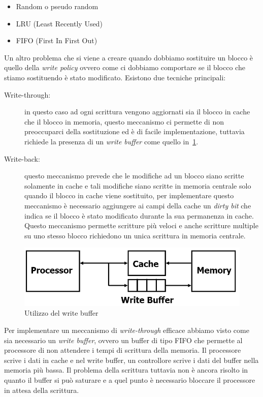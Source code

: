 \begin{itemize}
\item Random o pseudo random
\item LRU (Least Recently Used)
\item FIFO (First In First Out)
\end{itemize}
Un altro problema che si viene a creare quando dobbiamo sostituire un blocco è quello della \emph{write policy} ovvero come ci dobbiamo comportare se il blocco che stiamo sostituendo è stato modificato. Esistono due tecniche principali:
\begin{description}
\item[Write-through:] in questo caso ad ogni scrittura vengono aggiornati sia il blocco in cache che il blocco in memoria, questo meccanismo ci permette di non preoccuparci della sostituzione ed è di facile implementazione, tuttavia richiede la presenza di un \emph{write buffer} come quello in \figurename\,\ref{fig:writebuffer}. 
\item[Write-back:] questo meccanismo prevede che le modifiche ad un blocco siano scritte solamente in cache e tali modifiche siano scritte in memoria centrale solo quando il blocco in cache viene sostituito, per implementare questo meccanismo è necessario aggiungere ai campi della cache un \emph{dirty bit} che indica se il blocco è stato modificato durante la sua permanenza in cache.
Questo meccanismo permette scritture più veloci e anche scritture multiple su uno stesso blocco richiedono un unica scrittura in memoria centrale.
\end{description}
\begin{figure}[htb]
\centering
\includegraphics[scale=0.5]{img/writebuffer.png}
\caption{Utilizzo del write buffer}\label{fig:writebuffer}
\end{figure}
Per implementare un meccanismo di \emph{write-through} efficace abbiamo visto come sia necessario un \emph{write buffer}, ovvero un buffer di tipo FIFO che permette al processore di non attendere i tempi di scrittura della memoria. Il processore scrive i dati in cache e nel write buffer, un controllore scrive i dati del buffer nella memoria più bassa. Il problema della scrittura tuttavia non è ancora risolto in quanto il buffer si può saturare e a quel punto è necessario bloccare il processore in attesa della scrittura.\\
